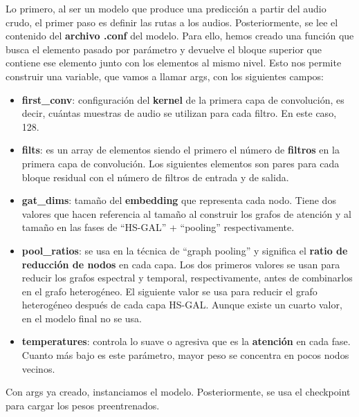Lo primero, al ser un modelo que produce una predicción a partir del audio crudo, el primer paso es definir las rutas a los audios. 
Posteriormente, se lee el contenido del \textbf{archivo .conf} del modelo. Para ello, hemos creado una función que busca el elemento pasado por parámetro y devuelve el bloque superior que contiene ese elemento junto con los elementos al mismo nivel. Esto nos permite construir una variable, que vamos a llamar args, con los siguientes campos:
\begin{itemize}
    \item \textbf{first\_conv}: configuración del \textbf{kernel} de la primera capa de convolución, es decir, cuántas muestras de audio se utilizan para cada filtro. En este caso, 128.
    \item \textbf{filts}: es un array de elementos siendo el primero el número de \textbf{filtros} en la primera capa de convolución. Los siguientes elementos son pares para cada bloque residual con el número de filtros de entrada y de salida.
    \item \textbf{gat\_dims}: tamaño del \textbf{embedding} que representa cada nodo. Tiene dos valores que hacen referencia al tamaño al construir los grafos de atención y al tamaño en las fases de ``HS-GAL'' + ``pooling'' respectivamente.
    \item \textbf{pool\_ratios}: se usa en la técnica de ``graph pooling'' y significa el \textbf{ratio de reducción de nodos} en cada capa. Los dos primeros valores se usan para reducir los grafos espectral y temporal, respectivamente, antes de combinarlos en el grafo heterogéneo. El siguiente valor se usa para reducir el grafo heterogéneo después de cada capa HS-GAL. Aunque existe un cuarto valor, en el modelo final no se usa.
    \item \textbf{temperatures}: controla lo suave o agresiva que es la \textbf{atención} en cada fase. Cuanto más bajo es este parámetro, mayor peso se concentra en pocos nodos vecinos.
\end{itemize}
Con args ya creado, instanciamos el modelo. Posteriormente, se usa el checkpoint para cargar los pesos preentrenados. 

